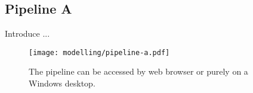 \subsection{Pipeline A}\label{subsec:pipeline-a}

Introduce ...

\begin{figure}[H]
    \centering
    \texttt{[image: modelling/pipeline-a.pdf]}
    \caption{The pipeline can be accessed by web browser or purely on a Windows desktop.}
    \label{fig:p:a}
\end{figure}



